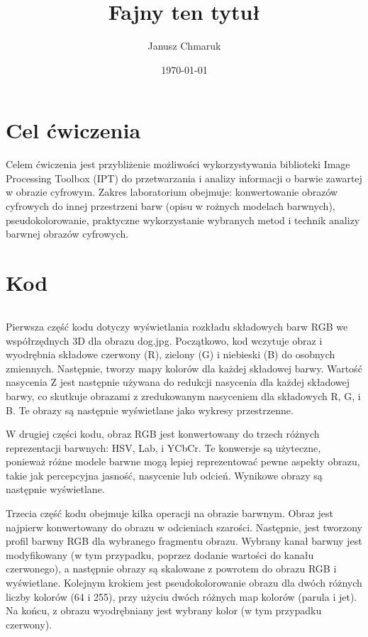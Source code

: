 \documentclass[10pt,a4paper,twoside,twocolumn]{article}%
\title{Fajny ten tytuł}%
\date{\today}%
\author{Janusz Chmaruk}%
\newenvironment{longlisting}{\captionsetup{type=listing}}{}
\begin{document}

\null%

\clearpage%

\tableofcontents%

\section{Cel ćwiczenia}%
Celem ćwiczenia jest przybliżenie możliwości wykorzystywania biblioteki Image Processing Toolbox (IPT) do przetwarzania i analizy informacji o barwie zawartej w obrazie cyfrowym. Zakres laboratorium obejmuje: konwertowanie obrazów cyfrowych do innej przestrzeni barw (opisu w rożnych modelach barwnych), pseudokolorowanie, praktyczne wykorzystanie wybranych metod i technik analizy barwnej obrazów cyfrowych.


\section{Kod}
\begin{longlisting}
    \inputminted{matlab}{kod/PSIO3x.m}
\end{longlisting}


Pierwsza część kodu dotyczy wyświetlania rozkładu składowych barw RGB we współrzędnych 3D dla obrazu dog.jpg. Początkowo, kod wczytuje obraz i wyodrębnia składowe czerwony (R), zielony (G) i niebieski (B) do osobnych zmiennych. Następnie, tworzy mapy kolorów dla każdej składowej barwy. Wartość nasycenia Z jest następnie używana do redukcji nasycenia dla każdej składowej barwy, co skutkuje obrazami z zredukowanym nasyceniem dla składowych R, G, i B\@. Te obrazy są następnie wyświetlane jako wykresy przestrzenne. 

W drugiej części kodu, obraz RGB jest konwertowany do trzech różnych reprezentacji barwnych: HSV, Lab, i YCbCr. Te konwersje są użyteczne, ponieważ różne modele barwne mogą lepiej reprezentować pewne aspekty obrazu, takie jak percepcyjna jasność, nasycenie lub odcień. Wynikowe obrazy są następnie wyświetlane. 

Trzecia część kodu obejmuje kilka operacji na obrazie barwnym. Obraz jest najpierw konwertowany do obrazu w odcieniach szarości. Następnie, jest tworzony profil barwny RGB dla wybranego fragmentu obrazu. Wybrany kanał barwny jest modyfikowany (w tym przypadku, poprzez dodanie wartości do kanału czerwonego), a następnie obrazy są skalowane z powrotem do obrazu RGB i wyświetlane. Kolejnym krokiem jest pseudokolorowanie obrazu dla dwóch różnych liczby kolorów (64 i 255), przy użyciu dwóch różnych map kolorów (parula i jet). Na końcu, z obrazu wyodrębniany jest wybrany kolor (w tym przypadku czerwony). 
\end{document}
